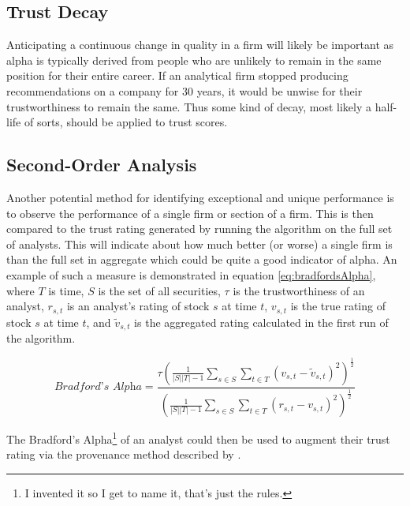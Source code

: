 \subsection{Trust Decay}
Anticipating a continuous change in quality in a firm will likely be important as alpha is typically derived from people who are unlikely to remain in the same position for their entire career. If an analytical firm stopped producing recommendations on a company for 30 years, it would be unwise for their trustworthiness to remain the same. Thus some kind of decay, most likely a half-life of sorts, should be applied to trust scores.

\subsection{Second-Order Analysis}
Another potential method for identifying exceptional and unique performance is to observe the performance of a single firm or section of a firm. This is then compared to the trust rating generated by running the algorithm on the full set of analysts. This will indicate about how much better (or worse) a single firm is than the full set in aggregate which could be quite a good indicator of alpha. An example of such a measure is demonstrated in equation \ref{eq:bradfordsAlpha}, where $T$ is time, $S$ is the set of all securities, $\tau$ is the trustworthiness of an analyst, $r_{s,t}$ is an analyst's rating of stock $s$ at time $t$, $v_{s,t}$ is the true rating of stock $s$ at time $t$, and $\tilde{v}_{s,t}$ is the aggregated rating calculated in the first run of the algorithm. 

\begin{equation}
    \textit{Bradford's Alpha} = \frac{\tau \left(\frac{1}{|S||T| - 1}\sum\limits_{s\in S}\sum\limits_{t\in T}(v_{s,t} - \tilde{v}_{s,t}) ^2\right)^\frac{1}{2}}{\left(\frac{1}{|S||T| - 1}\sum\limits_{s\in S}\sum\limits_{t\in T}(r_{s,t} - v_{s,t} )^2\right)^\frac{1}{2}} \label{eq:bradfordsAlpha}
\end{equation}

The Bradford's Alpha\footnote{I invented it so I get to name it, that's just the rules.} of an analyst could then be used to augment their trust rating via the provenance method described by \textcite{rezvani2018provenance}.






